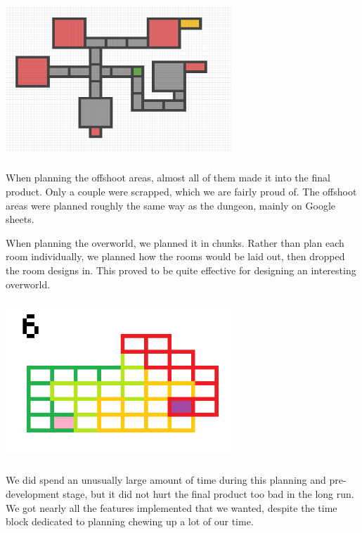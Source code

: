 \documentclass{sigchi}
\begin{document}
\includegraphics*[width=8.5cm, height=6cm]{./figures/DungeonLayout.png}

When planning the offshoot areas, almost all of them made it into the final product.  Only a couple were scrapped, which we are fairly proud of.  The offshoot areas were planned roughly the same way as the dungeon, mainly on Google sheets.

When planning the overworld, we planned it in chunks.  Rather than plan each room individually, we planned how the rooms would be laid out, then dropped the room designs in.  This proved to be quite effective for designing an interesting overworld.

\includegraphics*[width=8.5cm, height=6cm]{./figures/overworld.png}

We did spend an unusually large amount of time during this planning and pre-development stage, but it did not hurt the final product too bad in the long run.  We got nearly all the features implemented that we wanted, despite the time block dedicated to planning chewing up a lot of our time.
\end{document}
